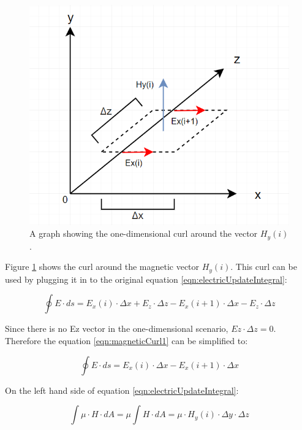 \begin{figure}
	\centering
	\includegraphics[scale=0.7]{Figures/fdtd1dHcurl}
	\decoRule
	\caption[1D Curl around $H_y$]{A graph showing the one-dimensional curl around the vector $H_y(i)$.}
	\label{fig:fdtd1dHcurl}
\end{figure}

Figure \ref{fig:fdtd1dHcurl} shows the curl around the magnetic vector $H_y(i)$. This curl can be used by plugging it in to the original equation \ref{eqn:electricUpdateIntegral}:

\begin{equation}
	\label{eqn:magneticCurl1}
	\oint E \cdot ds = E_x(i) \cdot \Delta x + E_z \cdot \Delta z - E_x(i+1) \cdot \Delta x - E_z \cdot \Delta z
\end{equation}

Since there is no Ez vector in the one-dimensional scenario, $Ez \cdot \Delta z = 0$. Therefore the equation \ref{eqn:magneticCurl1} can be simplified to:

\begin{equation}
	\label{eqn:magneticCurl2}
	\oint E \cdot ds = E_x(i) \cdot \Delta x - E_x(i+1) \cdot \Delta x
\end{equation}

On the left hand side of equation \ref{eqn:electricUpdateIntegral}:

\begin{equation}
	\label{eqn:magneticCurl3}
	\int \mu \cdot H \cdot dA = \mu \int H \cdot dA = \mu \cdot H_y(i) \cdot \Delta y \cdot \Delta z
\end{equation}

